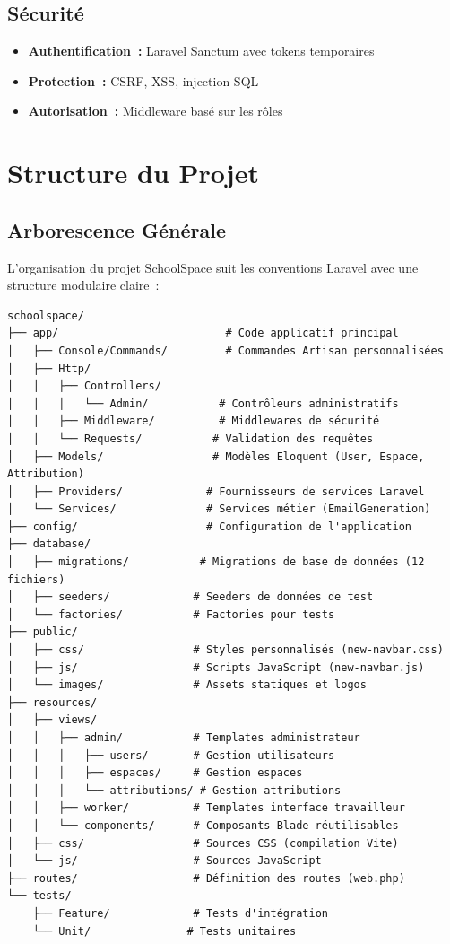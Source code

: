 \documentclass[12pt, a4paper, twoside, openany]{report}
\begin{document}
\subsection{Sécurité}
\begin{itemize}
    \item \textbf{Authentification~:} Laravel Sanctum avec tokens temporaires
    \item \textbf{Protection~:} CSRF, XSS, injection SQL
    \item \textbf{Autorisation~:} Middleware basé sur les rôles
\end{itemize}

\section{Structure du Projet}

\subsection{Arborescence Générale}
L'organisation du projet SchoolSpace suit les conventions Laravel avec une structure modulaire claire~:

\begin{lstlisting}[caption=Arborescence du projet SchoolSpace, basicstyle=\tiny\ttfamily]
schoolspace/
├── app/                          # Code applicatif principal
│   ├── Console/Commands/         # Commandes Artisan personnalisées
│   ├── Http/
│   │   ├── Controllers/
│   │   │   └── Admin/           # Contrôleurs administratifs
│   │   ├── Middleware/          # Middlewares de sécurité
│   │   └── Requests/           # Validation des requêtes
│   ├── Models/                 # Modèles Eloquent (User, Espace, Attribution)
│   ├── Providers/             # Fournisseurs de services Laravel
│   └── Services/              # Services métier (EmailGeneration)
├── config/                    # Configuration de l'application
├── database/
│   ├── migrations/           # Migrations de base de données (12 fichiers)
│   ├── seeders/             # Seeders de données de test
│   └── factories/           # Factories pour tests
├── public/
│   ├── css/                 # Styles personnalisés (new-navbar.css)
│   ├── js/                  # Scripts JavaScript (new-navbar.js)
│   └── images/              # Assets statiques et logos
├── resources/
│   ├── views/
│   │   ├── admin/           # Templates administrateur
│   │   │   ├── users/       # Gestion utilisateurs
│   │   │   ├── espaces/     # Gestion espaces
│   │   │   └── attributions/ # Gestion attributions
│   │   ├── worker/          # Templates interface travailleur
│   │   └── components/      # Composants Blade réutilisables
│   ├── css/                 # Sources CSS (compilation Vite)
│   └── js/                  # Sources JavaScript
├── routes/                  # Définition des routes (web.php)
└── tests/
    ├── Feature/             # Tests d'intégration
    └── Unit/               # Tests unitaires
\end{lstlisting}
\end{document}
